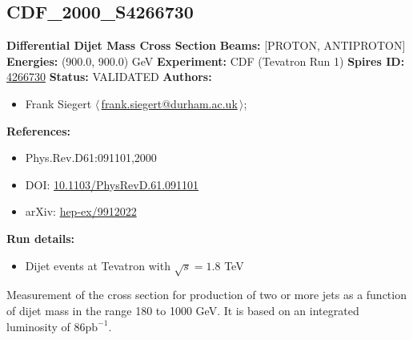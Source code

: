 \clearpage


\clearpage

\subsection[CDF\_2000\_S4266730]{CDF\_2000\_S4266730\,\cite{Affolder:1999ua}}
\textbf{Differential Dijet Mass Cross Section}\newline
\textbf{Beams:} [PROTON, ANTIPROTON] \newline
\textbf{Energies:} (900.0, 900.0) GeV \newline
\textbf{Experiment:} CDF (Tevatron Run 1) \newline
\textbf{Spires ID:} \href{http://www.slac.stanford.edu/spires/find/hep/www?rawcmd=key+4266730}{4266730}\newline
\textbf{Status:} VALIDATED\newline
\textbf{Authors:}
\begin{itemize}
  \item Frank Siegert $\langle\,$\href{mailto:frank.siegert@durham.ac.uk}{frank.siegert@durham.ac.uk}$\,\rangle$;
\end{itemize}
\textbf{References:}
\begin{itemize}
  \item Phys.Rev.D61:091101,2000
  \item DOI: \href{http://dx.doi.org/10.1103/PhysRevD.61.091101}{10.1103/PhysRevD.61.091101}
  \item arXiv: \href{http://arxiv.org/abs/hep-ex/9912022}{hep-ex/9912022}
\end{itemize}
\textbf{Run details:}
\begin{itemize}

  \item Dijet events at Tevatron with $\sqrt{s}=1.8$ TeV\end{itemize}

\noindent Measurement of the cross section for production of two or more jets as a function of dijet mass in the range 180 to 1000 GeV. It is based on an integrated luminosity of $86 \mathrm{pb}^{-1}$.

\clearpage


\clearpage

